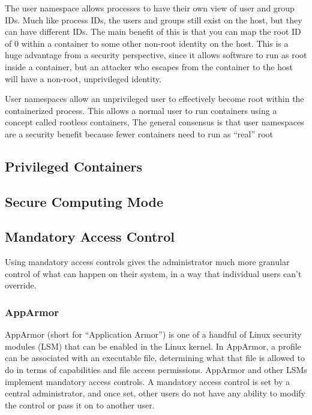 The user namespace allows processes to have their own view of user and group IDs. Much like process IDs, the users and groups still exist on the host, but they can have different IDs. The main benefit of this is that you can map the root ID of 0 within a container to some other non-root identity on the host. This is a huge advantage from a security perspective, since it allows software to run as root inside a container, but an attacker who escapes from the container to the host will have a non-root, unprivileged identity.

User namespaces allow an unprivileged user to effectively become root within the
containerized process. This allows a normal user to run containers using a concept called rootless containers, The general consensus is that user namespaces are a security benefit because fewer containers need to run as “real” root

\subsection{Privileged Containers}
\label{ssec::security:priv-cont}


\subsection{Secure Computing Mode}
\label{ssec::security:sec-compt}

\subsection{Mandatory Access Control}
\label{ssec::security:sel-apparm}

Using mandatory access controls gives the administrator much more granular control of what can happen on their system, in a way that individual users can't override.

\subsubsection{\textbf{AppArmor}}
AppArmor (short for “Application Armor”) is one of a handful of Linux security
modules (LSM) that can be enabled in the Linux kernel. In AppArmor, a profile can be associated with an executable file, determining what that file is allowed to do in terms of capabilities and file access permissions. AppArmor and other LSMs implement mandatory access controls. A mandatory access control is set by a central administrator, and once set, other users do not have any ability to modify the control or pass it on to another user.

